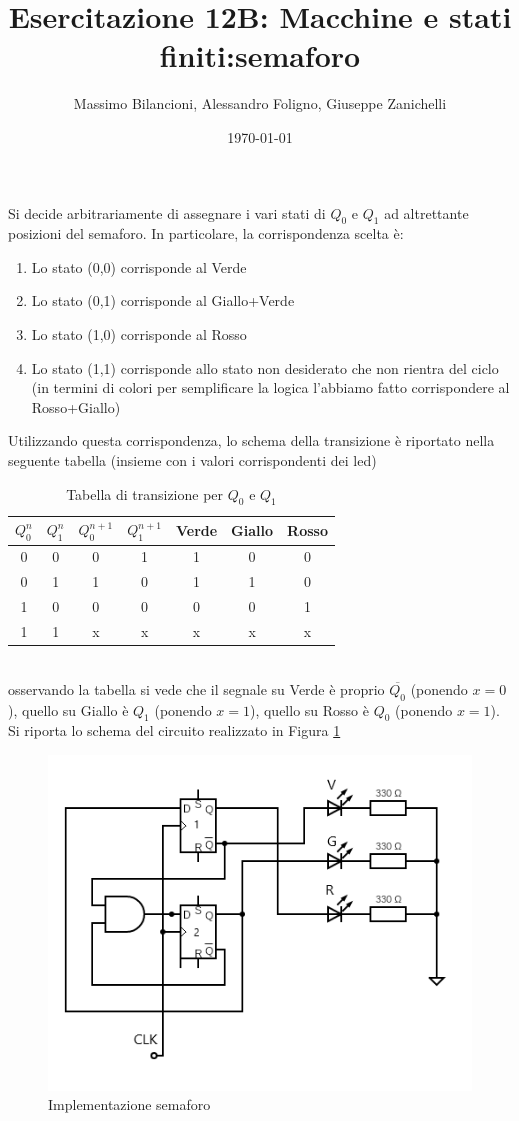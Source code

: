 \documentclass[10pt,a4paper]{article}
\date{\today}
\title{Esercitazione 12B: Macchine e stati finiti:semaforo}
\author{Massimo Bilancioni, Alessandro Foligno, Giuseppe Zanichelli}
\begin{document}
	
\maketitle
Si decide arbitrariamente di assegnare i vari stati di $Q_0$ e $Q_1$ ad altrettante posizioni del semaforo. In particolare, la corrispondenza scelta è:\\
\begin{enumerate}
	\item Lo stato (0,0) corrisponde al Verde
	\item Lo stato (0,1) corrisponde al Giallo+Verde
	\item Lo stato (1,0) corrisponde al Rosso
	\item Lo stato (1,1) corrisponde allo stato non desiderato che non rientra del ciclo (in termini di colori per semplificare la  logica  l'abbiamo fatto corrispondere al Rosso+Giallo)
\end{enumerate}
Utilizzando questa corrispondenza, lo schema della transizione è riportato nella seguente tabella (insieme con i valori corrispondenti dei led)\
\begin{table}[h]\centering
\begin{tabular}{|c|c|c|c|c|c|c|}
	\hline 
	$Q_0^n$ & $Q_1^n$ & $Q_0^{n+1}$ & $Q_1^{n+1}$ & Verde & Giallo & Rosso \\ 
	\hline 
	0 & 0 & 0 & 1 & 1 & 0 & 0 \\ 
	\hline 
	0 & 1 & 1 & 0 & 1 & 1 & 0 \\ 
	\hline 
	1 & 0 & 0 & 0 & 0 & 0 & 1 \\ 
	\hline 
	1 & 1 & x & x & x & x & x \\ 
	\hline 
\end{tabular} 	
\caption{Tabella di transizione per $Q_0$ e $Q_1$}
\end{table}
\\
osservando la tabella si vede che il segnale su Verde è proprio $\overline{Q_0}$ (ponendo $x =0$), quello su Giallo è $Q_1$ (ponendo $x= 1$), quello su Rosso è $Q_0$ (ponendo $x= 1$).
Si riporta lo schema del circuito realizzato in Figura \ref{fig:circ}

\begin{figure}[h]

			\centering

			\includegraphics[scale=0.85]{circuit}

			\caption{Implementazione semaforo}

			\label{fig:circ}

\end{figure}
\end{document}
